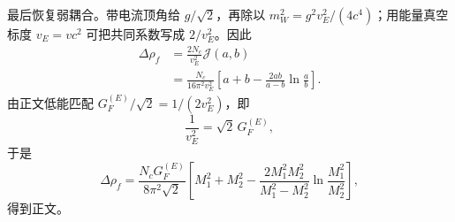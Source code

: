 \begin{derivation}[费米子质量分裂与电弱自能差]
最后恢复弱耦合。带电流顶角给 $g/\sqrt2$，再除以 $m_W^2=g^2v_E^2/(4c^4)$；用能量真空标度 $v_E=v c^2$ 可把共同系数写成 $2/v_E^2$。因此
\begin{align*}
\Delta\rho_f
&=\frac{2N_c}{v_E^2}\mathcal J(a,b)\\
&=\frac{N_c}{16\pi^2v_E^2}
\left[a+b-\frac{2ab}{a-b}\ln\frac ab\right].
\end{align*}
由正文低能匹配 $G_F^{(E)}/\sqrt2=1/(2v_E^2)$，即
\begin{equation*}
\frac1{v_E^2}=\sqrt2\,G_F^{(E)},
\end{equation*}
于是
\begin{equation*}
\Delta\rho_f
=\frac{N_cG_F^{(E)}}{8\pi^2\sqrt2}
\left[
M_1^2+M_2^2-
\frac{2M_1^2M_2^2}{M_1^2-M_2^2}
\ln\frac{M_1^2}{M_2^2}
\right],
\end{equation*}
得到正文。
\end{derivation}

